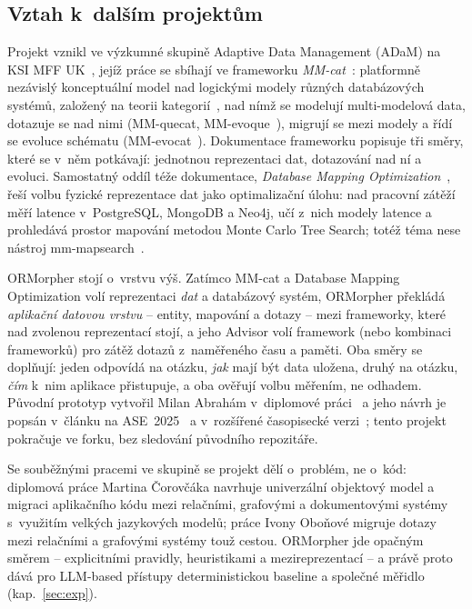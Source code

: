\documentclass{article}
\begin{document}
\subsection{Vztah k~dalším projektům}

Projekt vznikl ve výzkumné skupině Adaptive Data Management (ADaM) na KSI MFF UK~\cite{adam-web}, jejíž práce se sbíhají ve frameworku \emph{MM-cat}~\cite{mmcat-intro}: platformně nezávislý konceptuální model nad logickými modely různých databázových systémů, založený na teorii kategorií~\cite{koupil-holubova-2022}, nad nímž se modelují multi-modelová data, dotazuje se nad nimi (MM-quecat, MM-evoque~\cite{mm-quecat,mm-evoque}), migrují se mezi modely a řídí se evoluce schématu (MM-evocat~\cite{mm-evocat}). Dokumentace frameworku popisuje tři směry, které se v~něm potkávají: jednotnou reprezentaci dat, dotazování nad ní a evoluci. Samostatný oddíl téže dokumentace, \emph{Database Mapping Optimization}~\cite{mmcat-aimm}, řeší volbu fyzické reprezentace dat jako optimalizační úlohu: nad pracovní zátěží měří latence v~PostgreSQL, MongoDB a Neo4j, učí z~nich modely latence a prohledává prostor mapování metodou Monte Carlo Tree Search; totéž téma nese nástroj mm-mapsearch~\cite{mm-mapsearch}.

ORMorpher stojí o~vrstvu výš. Zatímco MM-cat a Database Mapping Optimization volí reprezentaci \emph{dat} a databázový systém, ORMorpher překládá \emph{aplikační datovou vrstvu} -- entity, mapování a dotazy -- mezi frameworky, které nad zvolenou reprezentací stojí, a jeho Advisor volí framework (nebo kombinaci frameworků) pro zátěž dotazů z~naměřeného času a paměti. Oba směry se doplňují: jeden odpovídá na otázku, \emph{jak} mají být data uložena, druhý na otázku, \emph{čím} k~nim aplikace přistupuje, a oba ověřují volbu měřením, ne odhadem. Původní prototyp vytvořil Milan Abrahám v~diplomové práci~\cite{abraham-repo} a jeho návrh je popsán v~článku na ASE~2025~\cite{ormorpher-ase} a v~rozšířené časopisecké verzi~\cite{ormorpher-jss}; tento projekt pokračuje ve forku, bez sledování původního repozitáře.

Se souběžnými pracemi ve skupině se projekt dělí o~problém, ne o~kód: diplomová práce Martina Čorovčáka navrhuje univerzální objektový model a migraci aplikačního kódu mezi relačními, grafovými a dokumentovými systémy s~využitím velkých jazykových modelů; práce Ivony Oboňové migruje dotazy mezi relačními a grafovými systémy touž cestou. ORMorpher jde opačným směrem -- explicitními pravidly, heuristikami a mezireprezentací -- a právě proto dává pro LLM-based přístupy deterministickou baseline a společné měřidlo (kap.~\ref{sec:exp}).
\end{document}
